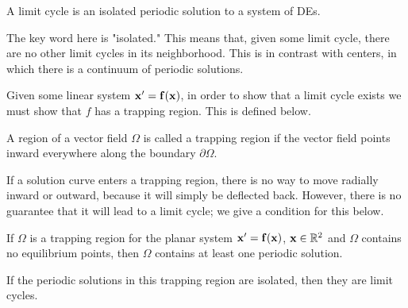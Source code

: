 \documentclass[../m082main.tex]{subfiles}
\begin{document}
\begin{definition}
    A limit cycle is an isolated periodic solution to a system of DEs.
\end{definition}

The key word here is "isolated."
This means that, given some limit cycle, there are no other limit cycles in its neighborhood.
This is in contrast with centers, in which there is a continuum of periodic solutions.

Given some linear system $\mathbf{x}' = \mathbf{f} (\mathbf{x})$, in order to show that a limit cycle exists we must show that $f$ has a trapping region.
This is defined below.

\begin{definition}
    A region of a vector field $\Omega$ is called a trapping region if the vector field points inward everywhere along the boundary $\partial \Omega$.
\end{definition}

If a solution curve enters a trapping region, there is no way to move radially inward or outward, because it will simply be deflected back.
However, there is no guarantee that it will lead to a limit cycle; we give a condition for this below.

\begin{theorem}
    If $\Omega$ is a trapping region for the planar system $\mathbf{x}' = \mathbf{f}(\mathbf{x})$, $\mathbf{x} \in \mathbb{R}^2$ and $\Omega$ contains no equilibrium points, then $\Omega$ contains at least one periodic solution.
\end{theorem}

If the periodic solutions in this trapping region are isolated, then they are limit cycles.
\end{document}
